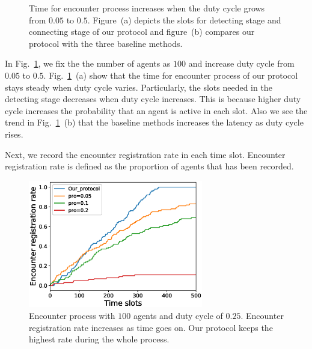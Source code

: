 \begin{figure}[!h]
    \centering
    \hspace{0.01in}
    \caption{Time for encounter process increases when the duty cycle grows from $0.05$ to $0.5$.
    Figure~(a) depicts the slots for detecting stage and connecting stage of our protocol and figure~(b)
    compares our protocol with the three baseline methods.}
    \label{fig_DC}
\end{figure}

In Fig.~\ref{fig_DC}, we fix the the number of agents as $100$ and
increase duty cycle from $0.05$ to $0.5$. Fig.~\ref{fig_DC}~(a) show that
the time for encounter process of our protocol stays steady when duty cycle varies.
Particularly, the slots needed in the detecting stage decreases when duty cycle increases.
This is because higher duty cycle increases the probability that an agent is active in each slot.
Also we see the trend in Fig.~\ref{fig_DC}~(b) that the baseline methods increases the latency as duty cycle rises.

Next, we record the encounter registration rate in each time slot.
Encounter registration rate is defined as the proportion of agents that has been 
recorded. 

\begin{figure}[!h]
    \centering
    \includegraphics[width=3in]{figures/figure5.eps}
    \caption{Encounter process with $100$ agents and duty cycle of $0.25$. 
    Encounter registration rate increases as time goes on. Our protocol keeps
    the highest rate during the whole process.}
    \label{fig5}
\end{figure}

